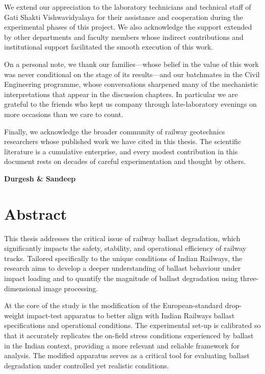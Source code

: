 We extend our appreciation to the laboratory technicians and technical staff of Gati Shakti Vishwavidyalaya for their assistance and cooperation during the experimental phases of this project. We also acknowledge the support extended by other departments and faculty members whose indirect contributions and institutional support facilitated the smooth execution of this work.

On a personal note, we thank our families---whose belief in the value of this work was never conditional on the stage of its results---and our batchmates in the Civil Engineering programme, whose conversations sharpened many of the mechanistic interpretations that appear in the discussion chapters. In particular we are grateful to the friends who kept us company through late-laboratory evenings on more occasions than we care to count.

Finally, we acknowledge the broader community of railway geotechnics researchers whose published work we have cited in this thesis. The scientific literature is a cumulative enterprise, and every modest contribution in this document rests on decades of careful experimentation and thought by others.

\vspace{0.8cm}
\hfill\textbf{Durgesh \& Sandeep}

\chapter*{Abstract}

This thesis addresses the critical issue of railway ballast degradation, which significantly impacts the safety, stability, and operational efficiency of railway tracks. Tailored specifically to the unique conditions of Indian Railways, the research aims to develop a deeper understanding of ballast behaviour under impact loading and to quantify the magnitude of ballast degradation using three-dimensional image processing.

At the core of the study is the modification of the European-standard drop-weight impact-test apparatus to better align with Indian Railways ballast specifications and operational conditions. The experimental set-up is calibrated so that it accurately replicates the on-field stress conditions experienced by ballast in the Indian context, providing a more relevant and reliable framework for analysis. The modified apparatus serves as a critical tool for evaluating ballast degradation under controlled yet realistic conditions.

